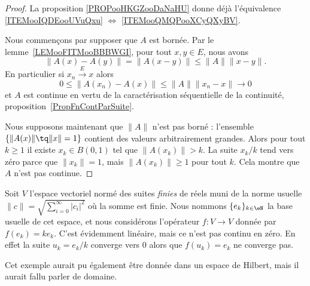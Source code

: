 \begin{proof}
	La proposition \ref{PROPooHKGZooDaNaHU} donne déjà l'équivalence \ref{ITEMooIQDEooUVuQxu} \( \Leftrightarrow\) \ref{ITEMooQMQPooXCyQXyBV}.

	Nous commençons par supposer que \( A\) est bornée. Par le lemme~\ref{LEMooFITMooBBBWGI}, pour tout \( x,y\in E\), nous avons
	\begin{equation}
		\| A(x)-A(y) \|=\| A(x-y) \|\leq \| A \|\| x-y \|.
	\end{equation}
	En particulier si \( x_n\stackrel{E}{\longrightarrow}x\) alors
	\begin{equation}
		0\leq \| A(x_n)-A(x) \|\leq \| A \|\| x_n-x \|\to 0
	\end{equation}
	et \( A\) est continue en vertu de la caractérisation séquentielle de la continuité, proposition~\ref{PropFnContParSuite}.

	Nous supposons maintenant que \( \| A \|\) n'est pas borné : l'ensemble \( \{ \| A(x) \|\tq \| x \|=1 \}\) contient des valeurs arbitrairement grandes. Alors pour tout \( k\geq 1\) il existe \( x_k\in B(0,1)\) tel que \( \| A(x_k) \|>k\). La suite \( x_k/k\) tend vers zéro parce que \( \| x_k \|=1\), mais \( \| A(x_k) \|\geq 1\) pour tout \( k\). Cela montre que \( A\) n'est pas continue.
\end{proof}


\begin{example}  \label{ExHKsIelG}
	Soit \( V\) l'espace vectoriel normé des suites \emph{finies} de réels muni de la norme usuelle \( \| c \|=\sqrt{\sum_{i=0}^{\infty}| c_i |^2}\) où la somme est finie. Nous nommons \( \{ e_k \}_{k\in \eN}\) la base usuelle de cet espace, et nous considérons l'opérateur \( f\colon V\to V\) donnée par \( f(e_k)=ke_k\). C'est évidemment linéaire, mais ce n'est pas continu en zéro. En effet la suite \( u_k=e_k/k\) converge vers \( 0\) alors que \( f(u_k)=e_k\) ne converge pas.
\end{example}

Cet exemple aurait pu également être donnée dans un espace de Hilbert, mais il aurait fallu parler de domaine.

